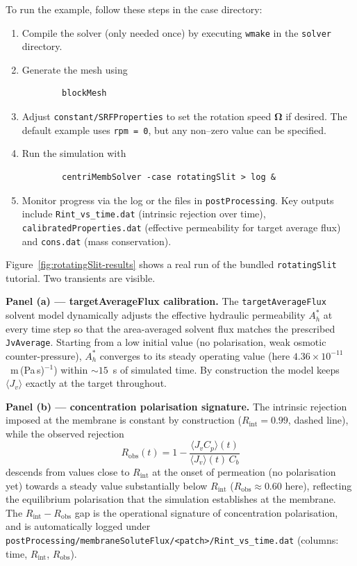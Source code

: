 \documentclass[11pt,a4paper]{article}
\begin{document}
To run the example, follow these steps in the case directory:

\begin{enumerate}
	\item Compile the solver (only needed once) by executing \texttt{wmake}
	in the \texttt{solver} directory.
	\item Generate the mesh using
	\begin{verbatim}
		blockMesh
	\end{verbatim}
	\item Adjust \texttt{constant/SRFProperties} to set the rotation
	speed $\boldsymbol{\Omega}$ if desired.  The default example uses
	\texttt{rpm = 0}, but any non–zero value can be specified.
	\item Run the simulation with
	\begin{verbatim}
		centriMembSolver -case rotatingSlit > log &
	\end{verbatim}
	\item Monitor progress via the log or the files in
	\texttt{postProcessing}.  Key outputs include
	\texttt{Rint\_vs\_time.dat} (intrinsic rejection over time),
	\texttt{calibratedProperties.dat} (effective permeability for
	target average flux) and \texttt{cons.dat} (mass conservation).
\end{enumerate}

Figure~\ref{fig:rotatingSlit-results} shows a real run of the bundled
\texttt{rotatingSlit} tutorial.  Two transients are visible.

\textbf{Panel (a) --- targetAverageFlux calibration.}
The \texttt{targetAverageFlux} solvent model dynamically adjusts the
effective hydraulic permeability $A_h^\ast$ at every time step so that
the area-averaged solvent flux matches the prescribed
\texttt{JvAverage}.  Starting from a low initial value (no
polarisation, weak osmotic counter-pressure), $A_h^\ast$ converges to
its steady operating value (here $4.36\times 10^{-11}$~m\,(Pa\,s)$^{-1}$)
within ${\sim}15$~s of simulated time.  By construction the model
keeps $\langle J_v\rangle$ exactly at the target throughout.

\textbf{Panel (b) --- concentration polarisation signature.}
The intrinsic rejection imposed at the membrane is constant by
construction ($R_\mathrm{int} = 0.99$, dashed line), while the
observed rejection
\begin{equation*}
	R_\mathrm{obs}(t) = 1 - \frac{\langle J_v C_p\rangle(t)}{\langle J_v\rangle(t)\,C_b}
\end{equation*}
descends from values close to $R_\mathrm{int}$ at the onset of
permeation (no polarisation yet) towards a steady value
substantially below $R_\mathrm{int}$ ($R_\mathrm{obs}\approx 0.60$
here), reflecting the equilibrium polarisation that the simulation
establishes at the membrane.  The $R_\mathrm{int}{-}R_\mathrm{obs}$
gap is the operational signature of concentration polarisation, and
is automatically logged under
\texttt{postProcessing/membraneSoluteFlux/<patch>/Rint\_vs\_time.dat}
(columns: time, $R_\mathrm{int}$, $R_\mathrm{obs}$).
\end{document}
